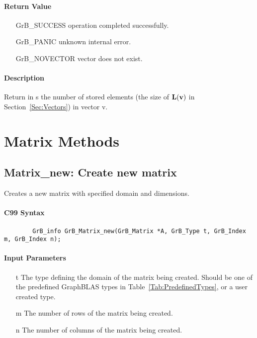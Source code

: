 \paragraph{Return Value}

\begin{itemize}[leftmargin=2.1in]
\item[{\sf GrB\_SUCCESS}]   operation completed successfully.
\item[{\sf GrB\_PANIC}]     unknown internal error.
\item[{\sf GrB\_NOVECTOR}]  vector does not exist.
\end{itemize}

\paragraph{Description}

Return in {\sf s} the number of stored elements (the size of $\bold{L}({\bf v})$
in Section~\ref{Sec:Vectors}) in vector {\sf v}.


\section{Matrix Methods}

\subsection{{\sf Matrix\_new}: Create new matrix}

Creates a new matrix with specified domain and dimensions.

\paragraph{C99 Syntax}

\begin{verbatim}
        GrB_info GrB_Matrix_new(GrB_Matrix *A, GrB_Type t, GrB_Index m, GrB_Index n);
\end{verbatim}

\paragraph{Input Parameters}

\begin{itemize}[leftmargin=1.1in]
    \item[{\sf t}] The type defining the domain of the matrix being created. Should be one of the predefined
    GraphBLAS types in Table~\ref{Tab:PredefinedTypes}, or a user created type.
    \item[{\sf m}] The number of rows of the matrix being created.
    \item[{\sf n}] The number of columns of the matrix being created.
\end{itemize}

